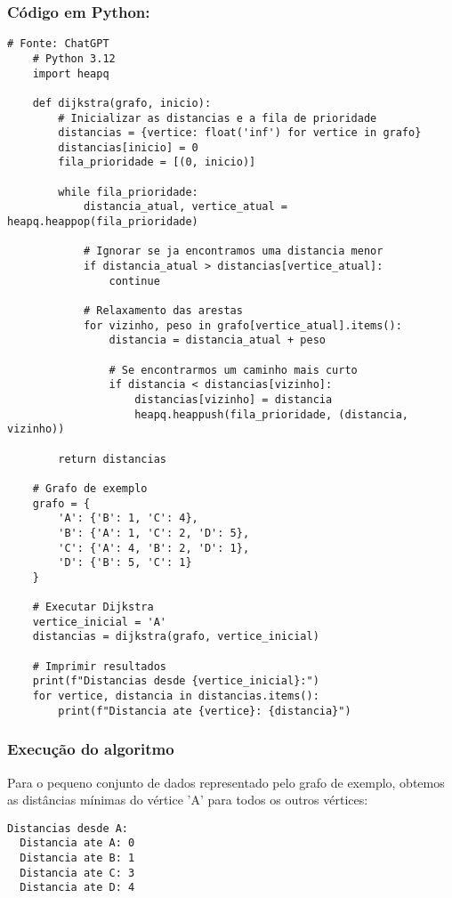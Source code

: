 \documentclass{article}
\begin{document}
\subsubsection{Código em Python:}
  \begin{lstlisting}[style=mypython]
    # Fonte: ChatGPT
    # Python 3.12
    import heapq

    def dijkstra(grafo, inicio):
        # Inicializar as distancias e a fila de prioridade
        distancias = {vertice: float('inf') for vertice in grafo}
        distancias[inicio] = 0
        fila_prioridade = [(0, inicio)]
        
        while fila_prioridade:
            distancia_atual, vertice_atual = heapq.heappop(fila_prioridade)

            # Ignorar se ja encontramos uma distancia menor
            if distancia_atual > distancias[vertice_atual]:
                continue

            # Relaxamento das arestas
            for vizinho, peso in grafo[vertice_atual].items():
                distancia = distancia_atual + peso

                # Se encontrarmos um caminho mais curto
                if distancia < distancias[vizinho]:
                    distancias[vizinho] = distancia
                    heapq.heappush(fila_prioridade, (distancia, vizinho))
        
        return distancias

    # Grafo de exemplo
    grafo = {
        'A': {'B': 1, 'C': 4},
        'B': {'A': 1, 'C': 2, 'D': 5},
        'C': {'A': 4, 'B': 2, 'D': 1},
        'D': {'B': 5, 'C': 1}
    }

    # Executar Dijkstra
    vertice_inicial = 'A'
    distancias = dijkstra(grafo, vertice_inicial)

    # Imprimir resultados
    print(f"Distancias desde {vertice_inicial}:")
    for vertice, distancia in distancias.items():
        print(f"Distancia ate {vertice}: {distancia}")

  \end{lstlisting}

\subsubsection{Execução do algoritmo}
Para o pequeno conjunto de dados representado pelo grafo de exemplo, 
obtemos as distâncias mínimas do vértice 'A' para todos os outros 
vértices:  
\begin{lstlisting}[style=mypython]
  Distancias desde A:
  Distancia ate A: 0
  Distancia ate B: 1
  Distancia ate C: 3
  Distancia ate D: 4    
\end{lstlisting}
\end{document}
